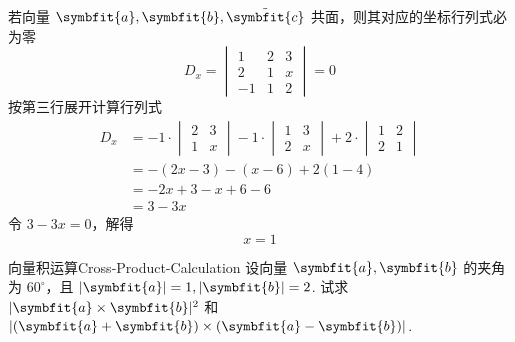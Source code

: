 \begin{solution}
    若向量 $\symbfit{a}, \symbfit{b}, \tilde{\symbfit{c}}$ 共面，则其对应的坐标行列式必为零
    \begin{equation*}
        D_x = \begin{vmatrix} 1 & 2 & 3 \\ 2 & 1 & x \\ -1 & 1 & 2 \end{vmatrix} = 0
    \end{equation*}
    按第三行展开计算行列式
    \begin{equation*}
        \begin{aligned}
            D_x & = -1 \cdot \begin{vmatrix} 2 & 3 \\ 1 & x \end{vmatrix} - 1 \cdot \begin{vmatrix} 1 & 3 \\ 2 & x \end{vmatrix} + 2 \cdot \begin{vmatrix} 1 & 2 \\ 2 & 1 \end{vmatrix} \\
                & = -(2x - 3) - (x - 6) + 2(1 - 4)                                                                                                                                      \\
                & = -2x + 3 - x + 6 - 6                                                                                                                                                 \\
                & = 3 - 3x
        \end{aligned}
    \end{equation*}
    令 $3 - 3x = 0$，解得
    \begin{equation*}
        \boxed{x = 1}
    \end{equation*}
\end{solution}


\begin{problem}{向量积运算}{Cross-Product-Calculation}
    设向量 $\symbfit{a}, \symbfit{b}$ 的夹角为 $60^\circ$，且 $|\symbfit{a}| = 1, |\symbfit{b}| = 2$. 试求 $|\symbfit{a} \times \symbfit{b}|^2$ 和 $|(\symbfit{a} + \symbfit{b}) \times (\symbfit{a} - \symbfit{b})|$.
\end{problem}

